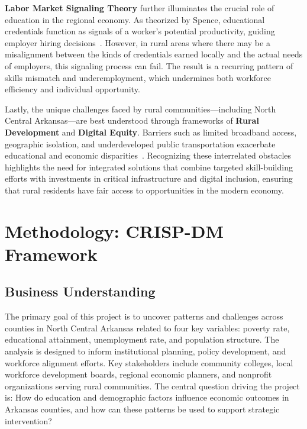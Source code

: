 \documentclass{llncs}
\begin{document}
\textbf{Labor Market Signaling Theory} further illuminates the crucial role of education in the regional economy. As theorized by Spence, educational credentials function as signals of a worker's potential productivity, guiding employer hiring decisions~\cite{linde_signalling_2025}. However, in rural areas where there may be a misalignment between the kinds of credentials earned locally and the actual needs of employers, this signaling process can fail. The result is a recurring pattern of skills mismatch and underemployment, which undermines both workforce efficiency and individual opportunity.

Lastly, the unique challenges faced by rural communities—including North Central Arkansas—are best understood through frameworks of \textbf{Rural Development} and \textbf{Digital Equity}. Barriers such as limited broadband access, geographic isolation, and underdeveloped public transportation exacerbate educational and economic disparities~\cite{WHITACRE20141011,urban2023,NTIA2023}. Recognizing these interrelated obstacles highlights the need for integrated solutions that combine targeted skill-building efforts with investments in critical infrastructure and digital inclusion, ensuring that rural residents have fair access to opportunities in the modern economy.

 
\section{Methodology: CRISP-DM Framework}\label{sec:CRISP-DM}

\subsection{Business Understanding}
The primary goal of this project is to uncover patterns and challenges across counties in North Central Arkansas related to four key variables: poverty rate, educational attainment, unemployment rate, and population structure. The analysis is designed to inform institutional planning, policy development, and workforce alignment efforts. Key stakeholders include community colleges, local workforce development boards, regional economic planners, and nonprofit organizations serving rural communities. The central question driving the project is: How do education and demographic factors influence economic outcomes in Arkansas counties, and how can these patterns be used to support strategic intervention?
\end{document}
